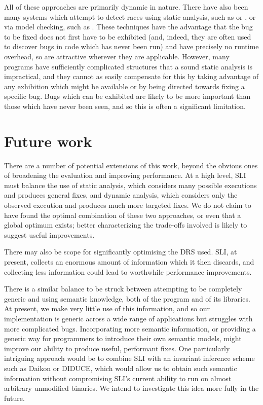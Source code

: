 \documentclass[10pt,twocolumn,preprint,natbib,authoryear]{sigplanconf}
\newcommand{\editorial}[1]{}
\begin{document}
All of these approaches are primarily dynamic in nature.  There have
also been many systems which attempt to detect races using static
analysis, such as \cite{Pratikakis2006} or \cite{Engler2003}, or via
model checking, such as \cite{Elmas06preciserace}.  These techniques
have the advantage that the bug to be fixed does not first have to be
exhibited (and, indeed, they are often used to discover bugs in code
which has never been run) and have precisely no runtime overhead, so
are attractive wherever they are applicable.  However, many programs
have sufficiently complicated structures that a sound static analysis
is impractical, and they cannot as easily compensate for this by
taking advantage of any exhibition which might be available or by
being directed towards fixing a specific bug.  Bugs which can be
exhibited are likely to be more important than those which have never
been seen, and so this is often a significant
limitation. \editorial{...}

\section{Future work}

There are a number of potential extensions of this work, beyond the
obvious ones of broadening the evaluation and improving performance.
At a high level, SLI must balance the use of static analysis, which
considers many possible executions and produces general fixes, and
dynamic analysis, which considers only the observed execution and
produces much more targeted fixes.  We do not claim to have found the
optimal combination of these two approaches, or even that a global
optimum exists; better characterizing the trade-offs involved is
likely to suggest useful improvements.

There may also be scope for significantly optimising the DRS used.
SLI, at present, collects an enormous amount of information which it
then discards, and collecting less information could lead to
worthwhile performance improvements.

There is a similar balance to be struck between attempting to be
completely generic and using semantic knowledge, both of the program
and of its libraries.  At present, we make very little use of this
information, and so our implementation is generic across a wide range
of applications but struggles with more complicated bugs.
Incorporating more semantic information, or providing a generic way
for programmers to introduce their own semantic models, might improve
our ability to produce useful, performant fixes.  One particularly
intriguing approach would be to combine SLI with an invariant
inference scheme such as Daikon\cite{Ernst2007} or
DIDUCE\cite{Hangal2002}, which would allow us to obtain such semantic
information without compromising SLI's current ability to run on
almost arbitrary unmodified binaries.  We intend to investigate this
idea more fully in the future.
\end{document}

